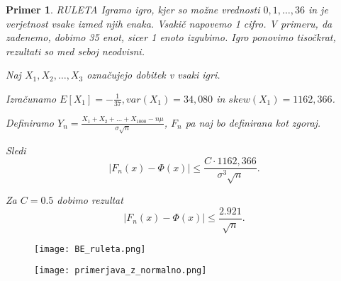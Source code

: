 \documentclass[12pt]{article}
\newtheorem{example}{Primer}
\begin{document}
\begin{example}{RULETA}
Igramo igro, kjer so možne vrednosti $0,1,\dots, 36$ in je verjetnost vsake izmed njih enaka. Vsakič napovemo 1 cifro. V primeru, da zadenemo, dobimo 35 enot, sicer 1 enoto izgubimo. Igro ponovimo tisočkrat, rezultati so med seboj neodvisni. 

Naj $X_1, X_2, \dots , X_3$  označujejo dobitek v vsaki igri.

Izračunamo $E[X_1] = - \frac{1}{37}, var(X_1) = 34,080$ in $skew(X_1) = 1162,366$.

Definiramo  $Y_n = \frac{X_1 +X_2 +\dots +X_{1000} - n\mu}{\sigma \sqrt{n}}$, $F_n$ pa naj bo definirana kot zgoraj.

Sledi $$|F_n(x) - \Phi(x)| \leq \frac{C \cdot 1162,366}{\sigma^3 \sqrt{n}}.$$

Za $C= 0.5$ dobimo rezultat  
$$|F_n(x) - \Phi(x)| \leq \frac{2.921}{\sqrt{n}}.$$

\end{example}

\begin{figure}[H]
    \centering
    \texttt{[image: BE\_ruleta.png]}
\end{figure}

\begin{figure}[H]
    \centering
    \texttt{[image: primerjava\_z\_normalno.png]}
\end{figure}
\end{document}
